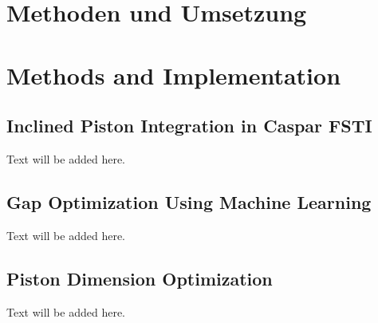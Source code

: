 {\chapter{Methoden und Umsetzung}}
{\chapter{Methods and Implementation}}
\label{sec:methods}

\section{Inclined Piston Integration in Caspar FSTI}
Text will be added here.

\section{Gap Optimization Using Machine Learning}
Text will be added here.

\section{Piston Dimension Optimization}
Text will be added here.
